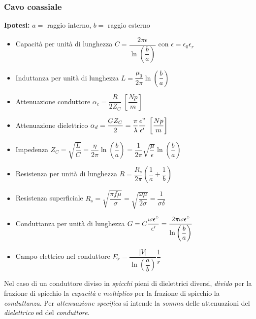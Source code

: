 \documentclass{article}
\begin{document}
\newpage

\subsubsection{Cavo coassiale}
\textbf{Ipotesi:} \(a = \) raggio interno, \(b = \) raggio esterno 
\begin{itemize}
	\item Capacità per unità di lunghezza \( C = \dfrac{2 \pi \epsilon}{\ln\left(\dfrac{b}{a}\right)} \) con \( \epsilon = \epsilon_0 \epsilon_r \)
	\item Induttanza per unità di lunghezza \( L = \dfrac{\mu_0}{2 \pi} \ln\left(\dfrac{b}{a}\right) \)
	\item Attenuazione conduttore \( \alpha_c = \dfrac{R}{2 Z_C} \; \left[\dfrac{Np}{m}\right]\)
	\item Attenuazione dielettrico \( \alpha_d = \dfrac{G Z_C}{2} = \dfrac{\pi}{\lambda}\dfrac{\epsilon"}{\epsilon'} \; \left[\dfrac{Np}{m}\right]\)
	\item Impedenza \( Z_C = \sqrt{\dfrac{L}{C}} = \dfrac{\eta}{2 \pi} \ln\left(\dfrac{b}{a} \right) =  \dfrac{1}{2 \pi} \sqrt{\dfrac{\mu}{\epsilon}} \ln\left(\dfrac{b}{a}\right)\)
	\item Resistenza per unità di lunghezza \( R = \dfrac{R_s}{2 \pi} \left( \dfrac{1}{a} + \dfrac{1}{b} \right) \)
	\item Resistenza superficiale \( R_s = \sqrt{\dfrac{\pi f \mu}{\sigma}} = \sqrt{\dfrac{\omega \mu}{2 \sigma}} = \dfrac{1}{\sigma \delta} \)
	\item Conduttanza per unità di lunghezza \( G = C \dfrac{\omega\epsilon"}{\epsilon'} = \dfrac{2 \pi \omega \epsilon"}{\ln\left(\dfrac{b}{a} \right)} \)
	\item Campo elettrico nel conduttore \( E_r = \dfrac{|V|}{\ln \left( \dfrac{a}{b}\right)} \dfrac{1}{r} \)
\end{itemize}
Nel caso di un conduttore diviso in \textit{spicchi} pieni di dielettrici diversi, \textit{divido} per la frazione di spicchio la \textit{capacità} e \textit{moltiplico} per la frazione di spicchio la \textit{conduttanza}.
Per \textit{attenuazione specifica} si intende la \textit{somma} delle attenuazioni del \textit{dielettrico} ed del \textit{conduttore}.
\end{document}
